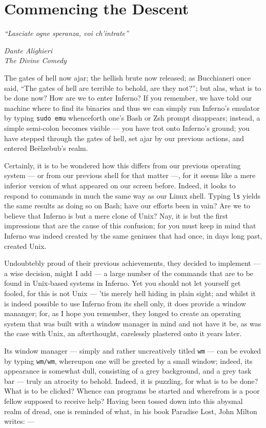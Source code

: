 \documentclass[a5paper,twoside,12pt]{report}
\begin{document}
\chapter*{Commencing the Descent}
  
  \epigraph{\textit{``Lasciate ogne speranza, voi ch'intrate''}}{\textit{Dante Alighieri\\The Divine Comedy}}

  The gates of hell now ajar; the hellish brute now released; as Bucchianeri once said, ``The gates of hell are terrible to behold, are they not?''; but alas, what is to be done now? How are we to enter Inferno? If you remember, we have told our machine where to find its binaries and thus we can simply run Inferno's emulator by typing \texttt{sudo emu} whenceforth one's Bash or Zsh prompt disappears; instead, a simple semi-colon becomes visible — you have trot onto Inferno's ground; you have stepped through the gates of hell, set ajar by our previous actions, and entered Be\"{e}lzebub's realm.

  Certainly, it is to be wondered how this differs from our previous operating system — or from our previous shell for that matter —, for it seems like a mere inferior version of what appeared on our screen before. Indeed, it looks to respond to commands in much the same way as our Linux shell. Typing \texttt{ls} yields the same results as doing so on Bash; have our efforts been in vain? Are we to believe that Inferno is but a mere clone of Unix? Nay, it is but the first impressions that are the cause of this confusion; for you must keep in mind that Inferno was indeed created by the same geniuses that had once, in days long past, created Unix.

  Undoubtebly proud of their previous achievements, they decided to implement — a wise decision, might I add — a large number of the commands that are to be found in Unix-based systems in Inferno. Yet you should not let yourself get fooled, for this is not Unix — 'tis merely hell hiding in plain sight; and whilst it is indeed possible to use Inferno from its shell only, it does provide a window mananger; for, as I hope you remember, they longed to create an operating system that was built with a window manager in mind and not have it be, as was the case with Unix, an afterthought, carelessly plastered onto it years later.

  Its window manager — simply and rather uncreatively titled \texttt{wm} — can be evoked by typing \texttt{wm/wm}, whereupon one will be greeted by a small window; indeed, its appearance is somewhat dull, consisting of a grey background, and a grey task bar — truly an atrocity to behold. Indeed, it is puzzling, for what is to be done? What is to be clicked? Whence can programs be started and wherefrom is a poor fellow supposed to receive help? Having been tossed down into this abysmal realm of dread, one is reminded of what, in his book Paradise Lost, John Milton writes: —
\end{document}

